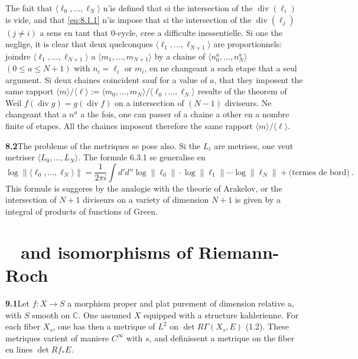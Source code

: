 \documentclass[12pt,a4paper]{article}
\theoremstyle{plain}
\theoremstyle{definition}
\theoremstyle{remark}
\DeclareMathOperator{\divm}{div}
\newcommand{\bbC}{\mathbb{C}}
\DeclareMathOperator{\ICtwo}{IC_2}
\begin{document}
The fait that $\langle \ell_0, \ldots, \ell_N \rangle$ n'is defined that si the intersection of the $\divm(\ell_i)$ is vide, and that \eqref{eq:8.1.1} n'is impose that si the intersection of the $\divm(\ell_j)$ $(j \neq i)$ a sens en tant that 0-cycle, cree a difficulte inessentielle. Si one the neglige, it is clear that deux quelconques $\langle \ell_1, \ldots, \ell_{N+1} \rangle$ are proportionnels: joindre $\langle \ell_1, \ldots, \ell_{N+1} \rangle$ a $\langle m_1, \ldots, m_{N+1} \rangle$ by a chaine of $\langle n_0^a, \ldots, n_N^a \rangle$ $(0 \leq a \leq N+1)$ with $n_i = \ell_i$ or $m_i$, en ne changeant a each etape that a seul argument. Si deux chaines coincident sauf for a value of $a$, that they imposent the same rapport $\langle m \rangle/\langle \ell \rangle := \langle m_0, \ldots, m_N\rangle/\langle \ell_0, \ldots, \ell_N\rangle$ resulte of the theorem of Weil $f(\divm g) = g(\divm f)$ on a intersection of $(N-1)$ diviseurs. Ne changeant that a $n^a$ a the fois, one can passer of a chaine a other en a nombre finite of etapes. All the chaines imposent therefore the same rapport $\langle m \rangle/\langle \ell \rangle$.

\medskip
\noindent\textbf{8.2}\quad The probleme of the metriques se pose also. Si the $L_i$ are metrises, one veut metriser $\langle L_0, \ldots, L_N \rangle$. The formule 6.3.1 se generalise en
\begin{equation}
\label{eq:8.2.1}
\log\|\langle \ell_0, \ldots, \ell_N \rangle\| = \frac{1}{2\pi i} \int d'd''\log\|\ell_0\| \cdot \log\|\ell_1\| \cdots \log\|\ell_N\| + \text{(termes de bord)} \ .
\end{equation}
This formule is suggeree by the analogie with the theorie of Arakelov, or the intersection of $N+1$ diviseurs on a variety of dimension $N+1$ is given by a integral of products of functions of Green.


\section{$\ICtwo$ and isomorphisms of Riemann-Roch}

\noindent\textbf{9.1}\quad Let $f: X \to S$ a morphism proper and plat purement of dimension relative a, with $S$ smooth on $\bbC$. One assumed $X$ equipped with a structure kahlerienne. For each fiber $X_s$, one has then a metrique of $L^2$ on $\det R\Gamma(X_s, E)$ (1.2). These metriques varient of maniere $C^\infty$ with $s$, and definissent a metrique on the fiber en lines $\det Rf_* E$.
\end{document}
